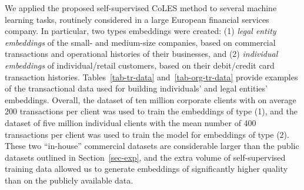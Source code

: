 \documentclass[sigconf]{acmart}
\begin{document}
We applied the proposed self-supervised CoLES method to several machine learning tasks, routinely
considered in a large European financial services company.
% 
In particular, two types embeddings were created:
(1) \emph{legal entity embeddings} of the small- and medium-size companies, based on commercial
transactions and operational histories of their businesses, and
(2) \emph{individual embeddings} of individual/retail customers, %
based on their debit/credit card transaction histories.
% 
Tables~\ref{tab-tr-data} and~\ref{tab-org-tr-data} provide examples of the transactional data
used for building individuals' and legal entities' embeddings. Overall, the dataset of ten
million corporate clients with on average 200 transactions per client was used to train the
embeddings of type (1), and the dataset of five million individual clients with the mean
number of 400 transactions per client was used to train the model for embeddings of type (2).
These two ``in-house'' commercial datasets are considerable larger than the public datasets
outlined in Section~\ref{sec-exp}, and the extra volume of self-supervised training data
allowed us to generate embeddings of significantly higher quality than on the publicly
available data.
\end{document}
